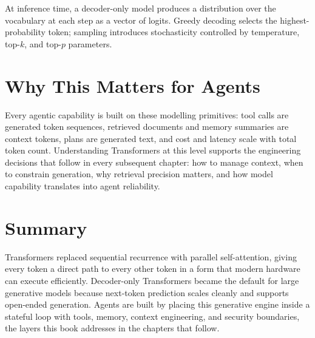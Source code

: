 At inference time, a decoder-only model produces a distribution over the vocabulary at
each step as a vector of logits. Greedy decoding selects the highest-probability token;
sampling introduces stochasticity controlled by temperature, top-$k$, and top-$p$
parameters.

\section{Why This Matters for Agents}

Every agentic capability is built on these modelling primitives: tool calls are generated
token sequences, retrieved documents and memory summaries are context tokens, plans are
generated text, and cost and latency scale with total token count. Understanding
Transformers at this level supports the engineering decisions that follow in every
subsequent chapter: how to manage context, when to constrain generation, why retrieval
precision matters, and how model capability translates into agent reliability.

\section{Summary}

Transformers replaced sequential recurrence with parallel self-attention, giving every
token a direct path to every other token in a form that modern hardware can execute
efficiently. Decoder-only Transformers became the default for large generative models
because next-token prediction scales cleanly and supports open-ended generation. Agents
are built by placing this generative engine inside a stateful loop with tools, memory,
context engineering, and security boundaries, the layers this book addresses in the
chapters that follow.